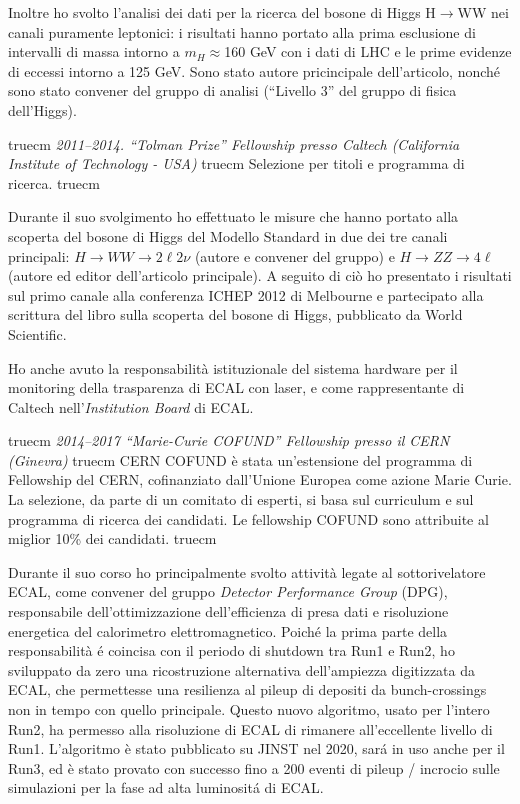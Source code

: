 \documentclass[11pt,twoside,a4paper]{article}
\begin{document}
Inoltre ho svolto l'analisi dei dati per la ricerca del bosone di
Higgs H$\to$WW nei canali puramente leptonici: i risultati hanno
portato alla prima esclusione di intervalli di massa intorno a
$m_H\approx$160 GeV con i dati di LHC e le prime evidenze di eccessi
intorno a 125 GeV. Sono stato autore pricincipale dell'articolo,
nonch\'e sono stato convener del gruppo di analisi (``Livello 3'' del
gruppo di fisica dell'Higgs).


 truecm
\textit{2011--2014. ``Tolman Prize'' Fellowship  presso Caltech (California Institute of Technology - USA)}
 truecm
Selezione per titoli e programma di ricerca.
 truecm

Durante il suo svolgimento ho effettuato le misure che hanno portato
alla scoperta del bosone di Higgs del Modello Standard in due dei tre
canali principali: $H \to WW\to 2\ell 2\nu$ (autore e convener del
gruppo) e $H\to ZZ \to 4\ell$ (autore ed editor dell'articolo
principale). A seguito di ci\`o ho presentato i risultati sul primo
canale alla conferenza ICHEP 2012 di Melbourne e partecipato alla
scrittura del libro sulla scoperta del bosone di Higgs, pubblicato da
World Scientific.

Ho anche avuto la responsabilit\`a istituzionale del sistema hardware
per il monitoring della trasparenza di ECAL con laser, e come
rappresentante di Caltech nell'\textit{Institution Board} di ECAL.


 truecm
\textit{2014--2017 ``Marie-Curie COFUND'' Fellowship presso il CERN (Ginevra)}
 truecm
CERN COFUND \`e stata un'estensione del programma di
Fellowship del CERN, cofinanziato dall'Unione Europea come azione
Marie Curie. La selezione, da parte di un comitato di esperti, si basa
sul curriculum e sul programma di ricerca dei candidati. Le fellowship
COFUND sono attribuite al miglior 10\% dei candidati.
 truecm

Durante il suo corso ho principalmente svolto attivit\`a legate al
sottorivelatore ECAL, come convener del gruppo \textit{Detector
  Performance Group} (DPG), responsabile dell'ottimizzazione
dell'efficienza di presa dati e risoluzione energetica del calorimetro
elettromagnetico. Poich\'e la prima parte della responsabilit\`a \'e
coincisa con il periodo di shutdown tra Run1 e Run2, ho sviluppato da
zero una ricostruzione alternativa dell'ampiezza digitizzata da ECAL,
che permettesse una resilienza al pileup di depositi da
bunch-crossings non in tempo con quello principale. Questo nuovo
algoritmo, usato per l'intero Run2, ha permesso alla risoluzione di
ECAL di rimanere all'eccellente livello di Run1. L'algoritmo \`e stato
pubblicato su JINST nel 2020, sar\'a in uso anche per il Run3, ed \`e
stato provato con successo fino a 200 eventi di pileup / incrocio
sulle simulazioni per la fase ad alta luminosit\'a di ECAL.
\end{document}
